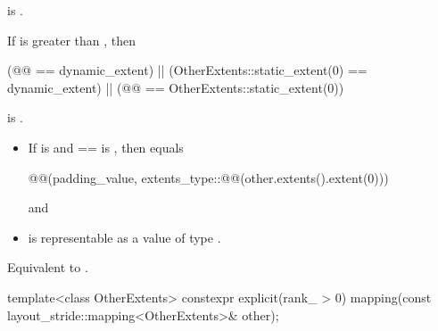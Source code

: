 \begin{itemdescr}
\pnum
\constraints
{} is .

\pnum
\mandates
If  is greater than , then
\begin{codeblock}
(@@ == dynamic_extent) ||
(OtherExtents::static_extent(0) == dynamic_extent) ||
(@@ == OtherExtents::static_extent(0))
\end{codeblock}
is .

\pnum
\expects
\begin{itemize}
\item
If  is  and
 ==  is ,
then  equals
\begin{codeblock}
@@(padding_value,
                        extents_type::@@(other.extents().extent(0)))
\end{codeblock}
and
\item
{} is representable as
a value of type .
\end{itemize}

\pnum
\effects
Equivalent to .
\end{itemdescr}

%
\begin{itemdecl}
template<class OtherExtents>
  constexpr explicit(rank_ > 0)
    mapping(const layout_stride::mapping<OtherExtents>& other);
\end{itemdecl}

